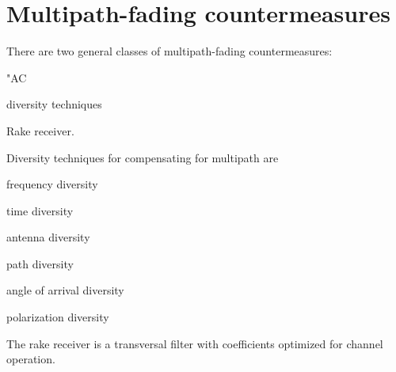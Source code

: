 \section{Multipath-fading countermeasures}
There are two general classes of multipath-fading countermeasures:
\begin{dingautolist}{"AC}
  \item diversity techniques 
  \item Rake receiver. 
\end{dingautolist}

Diversity techniques for compensating for multipath are
\begin{enume}
  \item frequency diversity
  \item time diversity
  \item antenna diversity
  \item path diversity
  \item angle of arrival diversity
  \item polarization diversity
\end{enume}

The rake receiver is a transversal filter with coefficients 
optimized for channel operation.





